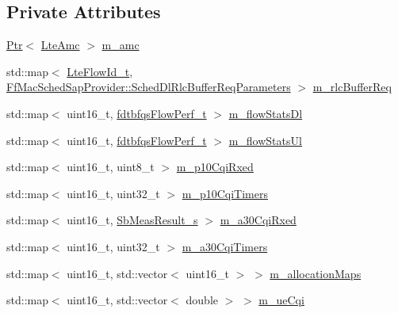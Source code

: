 \subsection*{Private Attributes}
\begin{DoxyCompactItemize}
\item 
\hyperlink{classns3_1_1Ptr}{Ptr}$<$ \hyperlink{classns3_1_1LteAmc}{Lte\+Amc} $>$ \hyperlink{classns3_1_1FdTbfqFfMacScheduler_a53e0bcb714cd32ee639f7b4e7265087c}{m\+\_\+amc}
\item 
std\+::map$<$ \hyperlink{structns3_1_1LteFlowId__t}{Lte\+Flow\+Id\+\_\+t}, \hyperlink{structns3_1_1FfMacSchedSapProvider_1_1SchedDlRlcBufferReqParameters}{Ff\+Mac\+Sched\+Sap\+Provider\+::\+Sched\+Dl\+Rlc\+Buffer\+Req\+Parameters} $>$ \hyperlink{classns3_1_1FdTbfqFfMacScheduler_a1de1056077db96c215eb47ef724e1167}{m\+\_\+rlc\+Buffer\+Req}
\item 
std\+::map$<$ uint16\+\_\+t, \hyperlink{structns3_1_1fdtbfqsFlowPerf__t}{fdtbfqs\+Flow\+Perf\+\_\+t} $>$ \hyperlink{classns3_1_1FdTbfqFfMacScheduler_ad55ff3305031aa6d2b3d351145754972}{m\+\_\+flow\+Stats\+Dl}
\item 
std\+::map$<$ uint16\+\_\+t, \hyperlink{structns3_1_1fdtbfqsFlowPerf__t}{fdtbfqs\+Flow\+Perf\+\_\+t} $>$ \hyperlink{classns3_1_1FdTbfqFfMacScheduler_a104df6ff96dc70c7daeffa99ca042f96}{m\+\_\+flow\+Stats\+Ul}
\item 
std\+::map$<$ uint16\+\_\+t, uint8\+\_\+t $>$ \hyperlink{classns3_1_1FdTbfqFfMacScheduler_a9f978cfdf8024b324d38301a06546cf7}{m\+\_\+p10\+Cqi\+Rxed}
\item 
std\+::map$<$ uint16\+\_\+t, uint32\+\_\+t $>$ \hyperlink{classns3_1_1FdTbfqFfMacScheduler_a9ef02ee999e33adc46b3ab820ea6450d}{m\+\_\+p10\+Cqi\+Timers}
\item 
std\+::map$<$ uint16\+\_\+t, \hyperlink{structns3_1_1SbMeasResult__s}{Sb\+Meas\+Result\+\_\+s} $>$ \hyperlink{classns3_1_1FdTbfqFfMacScheduler_a2c52c04323552283ec3f14a7ce083bc2}{m\+\_\+a30\+Cqi\+Rxed}
\item 
std\+::map$<$ uint16\+\_\+t, uint32\+\_\+t $>$ \hyperlink{classns3_1_1FdTbfqFfMacScheduler_a64ea10738e270f2cbb6d456c3851fcef}{m\+\_\+a30\+Cqi\+Timers}
\item 
std\+::map$<$ uint16\+\_\+t, std\+::vector$<$ uint16\+\_\+t $>$ $>$ \hyperlink{classns3_1_1FdTbfqFfMacScheduler_a5f22054304388f5f9469e3591b3bedea}{m\+\_\+allocation\+Maps}
\item 
std\+::map$<$ uint16\+\_\+t, std\+::vector$<$ double $>$ $>$ \hyperlink{classns3_1_1FdTbfqFfMacScheduler_a74c33465af3fd4306d994e9942836a27}{m\+\_\+ue\+Cqi}

\end{DoxyCompactItemize}
